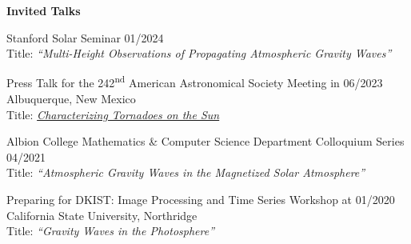 \documentclass{resume} %
\begin{document}
\vspace{-0.1in}
\begin{rSection}{\textbf{Invited Talks}}
\vspace{0.02in}

{Stanford Solar Seminar \hfill{01/2024} \\
Title: \emph{``Multi-Height Observations of Propagating Atmospheric Gravity Waves''}}

{Press Talk for the 242\textsuperscript{nd} American Astronomical Society Meeting in \hfill{06/2023} \\ Albuquerque, New Mexico} \\
Title: \href{https://aas.org/sites/default/files/2023-06/AAS242_Mon2_OanaVesa.pdf}{\emph{Characterizing Tornadoes on the Sun}}

{Albion College Mathematics \& Computer Science Department Colloquium Series \hfill{04/2021} \\
Title: \emph{``Atmospheric Gravity Waves in the Magnetized Solar Atmosphere''}}

{Preparing for DKIST: Image Processing and Time Series Workshop at \hfill{01/2020} \\  California State University, Northridge  \\
Title: \emph{``Gravity Waves in the Photosphere''}}
\end{rSection}
\end{document}
